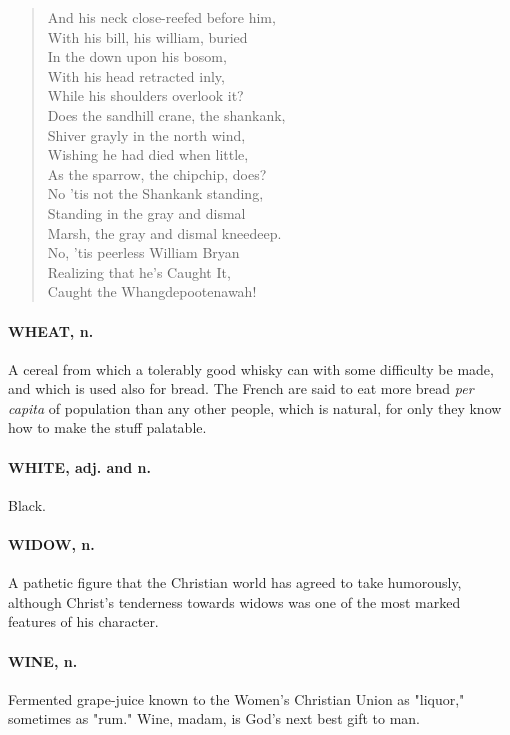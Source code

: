 \documentclass[11pt]{article}
\begin{document}
\begin{quote}
  And his neck close-reefed before him, \\
  With his bill, his william, buried \\
  In the down upon his bosom, \\
  With his head retracted inly, \\
  While his shoulders overlook it? \\
  Does the sandhill crane, the shankank, \\
  Shiver grayly in the north wind, \\
  Wishing he had died when little, \\
  As the sparrow, the chipchip, does? \\
  No 'tis not the Shankank standing, \\
  Standing in the gray and dismal \\
  Marsh, the gray and dismal kneedeep. \\
  No, 'tis peerless William Bryan \\
  Realizing that he's Caught It, \\
  Caught the Whangdepootenawah!  \end{quote}

\paragraph{WHEAT, n.}  A cereal from which a tolerably good whisky can with some
difficulty be made, and which is used also for bread.  The French are
said to eat more bread {\em per capita} of population than any other
people, which is natural, for only they know how to make the stuff
palatable.

\paragraph{WHITE, adj. and n.}  Black.

\paragraph{WIDOW, n.}  A pathetic figure that the Christian world has agreed to
take humorously, although Christ's tenderness towards widows was one
of the most marked features of his character.

\paragraph{WINE, n.}  Fermented grape-juice known to the Women's Christian Union
as "liquor," sometimes as "rum."  Wine, madam, is God's next best gift
to man.
\end{document}
